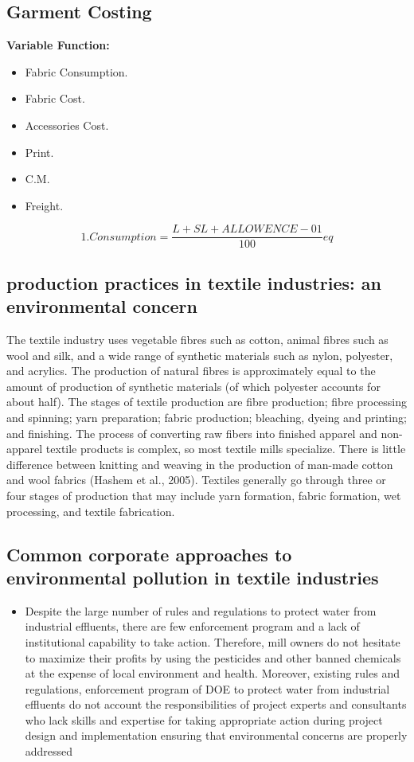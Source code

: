 \documentclass[conference]{IEEEtran}
\begin{document}
\subsection{Garment Costing}
\textbf{Variable Function:}
\begin{itemize}
  \item Fabric Consumption.
  \item Fabric Cost.
  \item Accessories Cost.
  \item Print.
  \item C.M.
  \item Freight.
\end{itemize}

\begin{equation}
1. Consumption = \frac{L + SL+ ALLOWENCE-01}{100}{eq}
\end{equation}

\subsection{\Current production practices in textile industries: an environmental concern}

The textile industry uses vegetable fibres such as cotton, animal fibres such as wool and silk, and a wide range of synthetic materials such as nylon, polyester, and acrylics. The production of natural fibres is approximately equal to the amount of production of synthetic materials (of which polyester accounts for about half). The stages of textile production are fibre production; fibre processing and spinning; yarn preparation; fabric production; bleaching, dyeing and printing; and finishing. The process of converting raw fibers into finished apparel and non-apparel textile products is complex, so most textile mills specialize. There is little difference between knitting and weaving in the production of man-made cotton and wool fabrics (Hashem et al., 2005). Textiles generally go through three or four stages of production that may include yarn formation, fabric formation, wet processing, and textile fabrication.

\subsection{Common corporate approaches to environmental pollution in textile industries}\label{SCM}
\begin{itemize}
\item Despite the large number of rules and regulations to protect water from industrial effluents, there are few enforcement program and a lack of institutional capability to take action. Therefore, mill owners do not hesitate to maximize their profits by using the pesticides and other banned chemicals at the expense of local environment and health. Moreover, existing rules and regulations, enforcement program of DOE to protect water from industrial effluents do not account the responsibilities of project experts and consultants who lack skills and expertise for taking appropriate action during project design and implementation ensuring that environmental concerns are properly addressed

\end{itemize}
\end{document}
